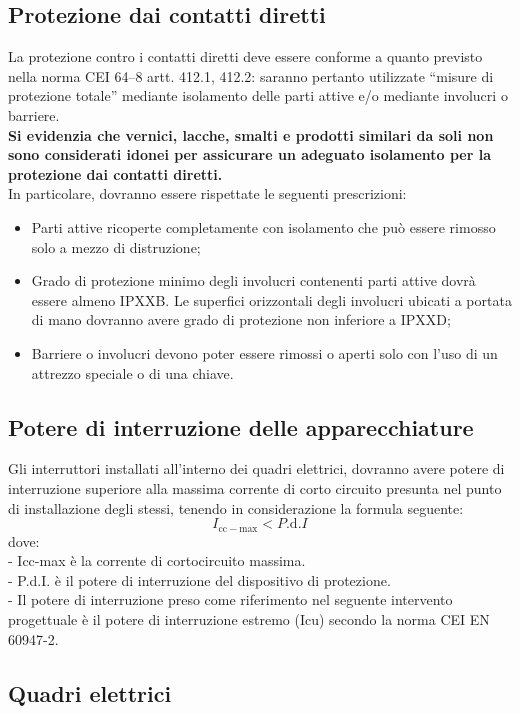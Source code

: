 \subsection{Protezione dai contatti diretti}
La protezione contro i contatti diretti deve essere conforme a quanto previsto nella norma CEI 64–8 artt. 412.1, 412.2: saranno pertanto utilizzate “misure di protezione totale” mediante isolamento delle parti attive e/o mediante involucri o barriere. \\
\textbf{Si evidenzia che vernici, lacche, smalti e prodotti similari da soli non sono considerati idonei per assicurare un adeguato isolamento per la protezione dai contatti diretti.} \\
In particolare, dovranno essere rispettate le seguenti prescrizioni: 
\begin{itemize}
    \item Parti attive ricoperte completamente con isolamento che può essere rimosso solo a
mezzo di distruzione;
    \item Grado di protezione minimo degli involucri contenenti parti attive dovrà essere almeno
IPXXB. Le superfici orizzontali degli involucri ubicati a portata di mano dovranno avere
grado di protezione non inferiore a IPXXD;
    \item Barriere o involucri devono poter essere rimossi o aperti solo con l’uso di un attrezzo
speciale o di una chiave.
\end{itemize}


\subsection{Potere di interruzione delle apparecchiature}
Gli interruttori installati all’interno dei quadri elettrici, dovranno avere potere di interruzione superiore alla massima corrente di corto circuito presunta nel punto di installazione degli stessi, tenendo in considerazione la formula seguente: 
\[ I_{\mathrm{cc-max}} < P\mathrm{.d.}I \]
dove: \\
- Icc-max è la corrente di cortocircuito massima.  \\
- P.d.I. è il potere di interruzione del dispositivo di protezione. \\
- Il potere di interruzione preso come riferimento nel seguente intervento progettuale è il potere di interruzione estremo (Icu) secondo la norma CEI EN 60947-2. \\


\subsection{Quadri elettrici}
